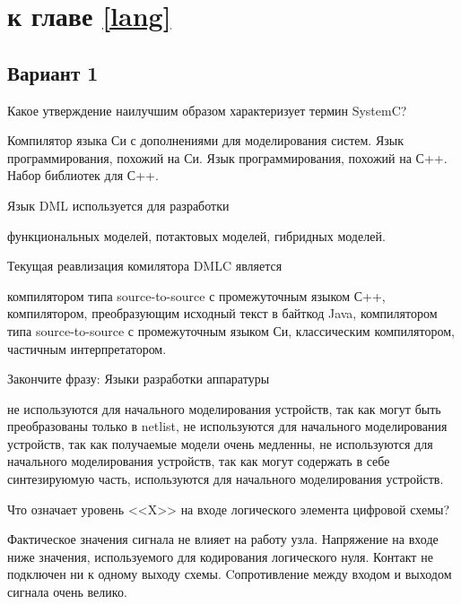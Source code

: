\section{\Questions к главе \ref{lang}} %

\subsection*{Вариант 1}

\begin{questions}

\question[3] Какое утверждение наилучшим образом характеризует термин SystemC?
\begin{choices}
    \choice Компилятор языка Си с дополнениями для моделирования систем.
    \choice Язык программирования, похожий на Си.
    \choice Язык программирования, похожий на С++.
    \correctchoice Набор библиотек для С++.
\end{choices}

\question[3] Язык DML используется для разработки
\begin{choices}
    \correctchoice функциональных моделей,
    \choice потактовых моделей,
    \choice гибридных моделей.
\end{choices}

\question[3] Текущая реавлизация комилятора DMLC является
\begin{choices}
    \choice компилятором типа source-to-source с промежуточным языком С++,
    \choice компилятором, преобразующим исходный текст в байткод Java,
    \correctchoice компилятором типа source-to-source с промежуточным языком Си,
    \choice классическим компилятором,
    \choice частичным интерпретатором.
\end{choices}

\question[3] Закончите фразу: Языки разработки аппаратуры
\begin{choices}
\choice не используются для начального моделирования устройств, так как могут быть преобразованы только в netlist,
\correctchoice не используются для начального моделирования устройств, так как получаемые модели очень медленны,
\choice не используются для начального моделирования устройств, так как могут содержать в себе синтезируюмую часть,
\choice используются для начального моделирования устройств.
\end{choices}

\question[3] Что означает уровень <<X>> на входе логического элемента цифровой схемы?
\begin{choices}
    \correctchoice Фактическое значения сигнала не влияет на работу узла.
	\choice Напряжение на входе ниже значения, используемого для кодирования логического нуля.
    \choice Контакт не подключен ни к одному выходу схемы.
	\choice Cопротивление между входом и выходом сигнала очень велико.
\end{choices}

\end{questions}

